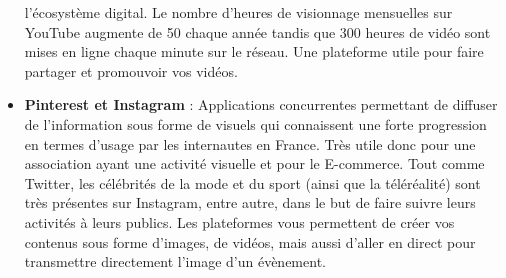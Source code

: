 \documentclass[12pt,a4paper,titlepage]{article}
\begin{document}
\begin{itemize}
l’écosystème digital. Le nombre d’heures de visionnage mensuelles sur YouTube augmente de 50 %
chaque année tandis que 300 heures de vidéo sont mises en ligne chaque minute sur le réseau. Une
plateforme utile pour faire partager et promouvoir vos vidéos.
 \item \textbf{Pinterest et Instagram} : Applications concurrentes permettant de diffuser de l’information sous
forme de visuels qui connaissent une forte progression en termes d’usage par les internautes en France.
Très utile donc pour une association ayant une activité visuelle et pour le E-commerce. Tout comme
Twitter, les célébrités de la mode et du sport (ainsi que la téléréalité) sont très présentes sur Instagram,
entre autre, dans le but de faire suivre leurs activités à leurs publics. Les plateformes vous permettent
de créer vos contenus sous forme d’images, de vidéos, mais aussi d’aller en direct pour transmettre
directement l’image d’un évènement.
\end{itemize}
\end{document}
